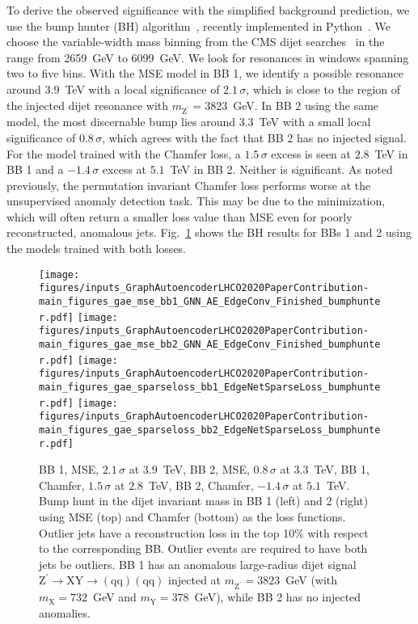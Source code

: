 \documentclass[a4paper,11pt]{article}
\newcommand{\PZpr}{\ensuremath{\mathrm{Z}^{\prime}}\xspace} \newcommand{\PW}{\ensuremath{\mathrm{W}}\xspace} \newcommand{\PWpr}{\ensuremath{\mathrm{W}^{\prime}}\xspace} \newcommand{\PX}{\ensuremath{\mathrm{X}}\xspace} \newcommand{\PY}{\ensuremath{\mathrm{Y}}\xspace} \newcommand{\Pq}{\ensuremath{\mathrm{q}}\xspace}
\begin{document}
To derive the observed significance with the simplified background prediction, we use the bump hunter (BH) algorithm~\cite{Choudalakis:2011qn}, recently implemented in Python~\cite{pybumphunter}.
We choose the variable-width mass binning from the CMS dijet searches~\cite{Sirunyan:2018xlo} in the range from 2659~GeV to 6099~GeV.
We look for resonances in windows spanning two to five bins.
With the MSE model in BB 1, we identify a possible resonance around $3.9$~TeV with a local significance of $2.1\,\sigma$, which is close to the region of the injected dijet resonance with $m_\PZpr=3823$~GeV.
In BB 2 using the same model, the most discernable bump lies around $3.3$~TeV with a small local significance of $0.8\,\sigma$, which agrees with the fact that BB 2 has no injected signal. 
For the model trained with the Chamfer loss, a $1.5\,\sigma$ excess is seen at $2.8$~TeV in BB 1 and a $-1.4\,\sigma$ excess at $5.1$~TeV in BB 2. 
Neither is significant.
As noted previously, the permutation invariant Chamfer loss performs worse at the unsupervised anomaly detection task.
This may be due to the minimization, which will often return a smaller loss value than MSE even for poorly reconstructed, anomalous jets.
Fig.~\ref{fig:gnnaebumps} shows the BH results for BBs 1 and 2 using the models trained with both losses.


\begin{figure}[htpb]
    \centering
        \texttt{[image: figures/inputs\_GraphAutoencoderLHCO2020PaperContribution-main\_figures\_gae\_mse\_bb1\_GNN\_AE\_EdgeConv\_Finished\_bumphunter.pdf]}
        \texttt{[image: figures/inputs\_GraphAutoencoderLHCO2020PaperContribution-main\_figures\_gae\_mse\_bb2\_GNN\_AE\_EdgeConv\_Finished\_bumphunter.pdf]}
        \texttt{[image: figures/inputs\_GraphAutoencoderLHCO2020PaperContribution-main\_figures\_gae\_sparseloss\_bb1\_EdgeNetSparseLoss\_bumphunter.pdf]}
        \texttt{[image: figures/inputs\_GraphAutoencoderLHCO2020PaperContribution-main\_figures\_gae\_sparseloss\_bb2\_EdgeNetSparseLoss\_bumphunter.pdf]}
\caption{BB 1, MSE, $2.1\,\sigma$ at $3.9$~TeV, BB 2, MSE, $0.8\,\sigma$ at $3.3$~TeV, BB 1, Chamfer, $1.5\,\sigma$ at $2.8$~TeV, BB 2, Chamfer, $-1.4\,\sigma$ at $5.1$~TeV.  Bump hunt in the dijet invariant mass in BB 1 (left) and 2 (right) using MSE (top) and Chamfer (bottom) as the loss functions.
Outlier jets have a reconstruction loss in the top 10\% with respect to the corresponding BB. 
Outlier events are required to have both jets be outliers.
BB 1 has an anomalous large-radius dijet signal $\PZpr \to \PX\PY \to (\Pq\Pq)(\Pq\Pq)$ injected at $m_\PZpr=3823$~GeV (with $m_\PX = 732$~GeV and $m_\PY= 378$~GeV), while BB 2 has no injected anomalies.
}
\label{fig:gnnaebumps}
\end{figure}
\end{document}
